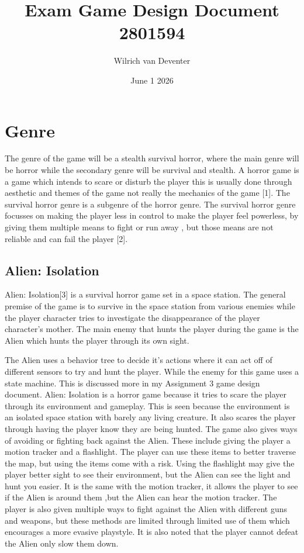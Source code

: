 \documentclass{article}
\title{Exam Game Design Document \\[1ex] \large 2801594}
\author{Wilrich van Deventer}
\date{June 1 2026}
\begin{document}
\maketitle
\section{Genre}
The genre of the game will be a stealth survival horror, where the main genre will be horror while the secondary genre 
will be survival and stealth. A horror game is a game which intends to scare or disturb the player this is usually done
through aesthetic and themes of the game not really the mechanics of the game [1]. The survival horror genre is
a subgenre of the horror genre. The survival horror genre focusses on making the player less in control to make the player
feel powerless, by giving them multiple means to fight or run away , but those means are not reliable and can fail the player [2].

\subsection{Alien: Isolation}
Alien: Isolation[3] is a survival horror game set in a space station. The general premise of the game is to survive
in the space station from various enemies while the player character tries to investigate the disappearance of the player
character's mother. The main enemy that hunts the player during the game is the Alien which hunts the player through its
own sight. 


The Alien uses a behavior tree to decide it's actions where it can act off of different sensors to try and hunt the player.
While the enemy for this game uses a state machine. This is discussed more in my Assignment 3 game design document.
Alien: Isolation is a horror game because it tries to scare the player through its environment and gameplay. This is seen
because the environment is an isolated space station with barely any living creature. It also scares the player through
having the player know they are being hunted. The game also gives ways of avoiding or fighting back against the Alien.
These include giving the player a motion tracker and a flashlight. The player can use these items to better traverse 
the map, but using the items come with a risk. Using the flashlight may give the player better sight to see their
environment, but the Alien can see the light and hunt you easier. It is the same with the motion tracker, it allows
the player to see if the Alien is around them ,but the Alien can hear the motion tracker. The player is also given
multiple ways to fight against the Alien with different guns and weapons, but these methods are limited through
limited use of them which encourages a more evasive playstyle. It is also noted that the player cannot defeat the Alien
only slow them down.
\end{document}
